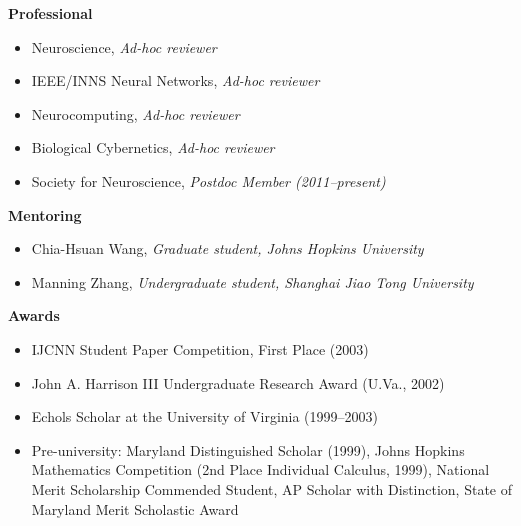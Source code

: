 \documentclass[10pt]{article}
\begin{document}
{\large \textbf{Professional}}
\begin{itemize}
    \item Neuroscience, \emph{Ad-hoc reviewer}
    \item IEEE/INNS Neural Networks, \emph{Ad-hoc reviewer}
    \item Neurocomputing, \emph{Ad-hoc reviewer}
    \item Biological Cybernetics, \emph{Ad-hoc reviewer}
    \item Society for Neuroscience, \emph{Postdoc Member (2011--present)}
\end{itemize}
    
{\large \textbf{Mentoring}}
\begin{itemize}
    \item Chia-Hsuan Wang, \emph{Graduate student, Johns Hopkins University}
    \item Manning Zhang, \emph{Undergraduate student, Shanghai Jiao Tong University}
\end{itemize}

{\large \textbf{Awards}}
\begin{itemize}
    \item IJCNN Student Paper Competition, First Place (2003)
    \item John A. Harrison III Undergraduate Research Award (U.Va., 2002)                          
    \item Echols Scholar at the University of Virginia (1999--2003)                              
    \item Pre-university: Maryland Distinguished Scholar (1999), Johns Hopkins Mathematics Competition (2nd Place Individual Calculus, 1999), National Merit Scholarship Commended Student, AP Scholar with Distinction, State of Maryland Merit Scholastic Award 
\end{itemize}

\end{document}
